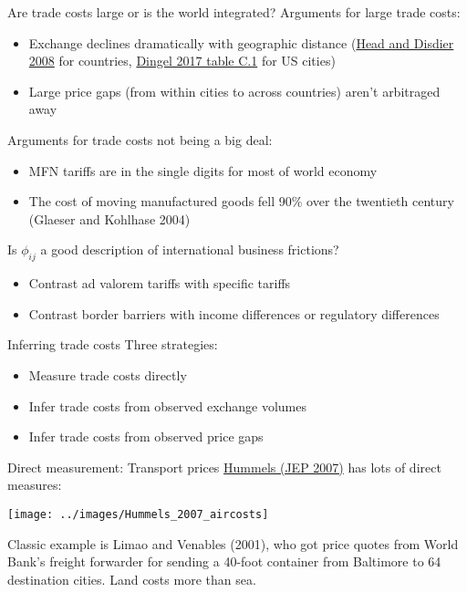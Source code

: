 \documentclass[10pt,notes=hide,aspectratio=169]{beamer}
\begin{document}
\begin{frame}{Are trade costs large or is the world integrated?}
Arguments for large trade costs:
\begin{itemize}
	\item Exchange declines dramatically with geographic distance ({\small \href{https://www.mitpressjournals.org/doi/10.1162/rest.90.1.37}{Head and Disdier 2008} for countries, \href{http://faculty.chicagobooth.edu/jonathan.dingel/research/thedeterminantsofqualityspecialization.pdf}{Dingel 2017 table C.1} for US cities})
	\item Large price gaps (from within cities to across countries) aren't arbitraged away
\end{itemize}
Arguments for trade costs not being a big deal:
\begin{itemize}
	\item MFN tariffs are in the single digits for most of world economy
	\item The cost of moving manufactured goods fell 90\% over the twentieth century (Glaeser and Kohlhase 2004)
\end{itemize}
Is $\phi_{ij}$ a good description of international business frictions?
\begin{itemize}
	\item Contrast ad valorem tariffs with specific tariffs
	\item Contrast border barriers with income differences or regulatory differences
\end{itemize}
\end{frame}
\begin{frame}{Inferring trade costs}
Three strategies:
\begin{itemize}
	\item Measure trade costs directly
	\item Infer trade costs from observed exchange volumes
	\item Infer trade costs from observed price gaps
\end{itemize}
\end{frame}
\begin{frame}{Direct measurement: Transport prices}
\href{https://www.aeaweb.org/articles?id=10.1257/jep.21.3.131}{Hummels (JEP 2007)} has lots of direct measures:
\begin{center}
\texttt{[image: ../images/Hummels\_2007\_aircosts]}
\end{center}
Classic example is Limao and Venables (2001), who got price quotes from World Bank's freight forwarder for sending a 40-foot container from Baltimore to 64 destination cities.
Land costs more than sea.
\end{frame}
\end{document}
